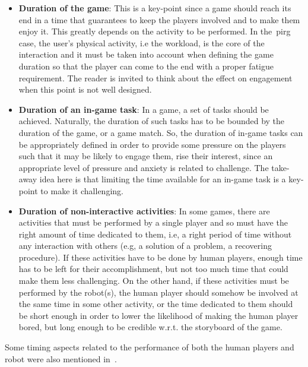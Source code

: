 \begin{itemize}
\item \textbf{Duration of the game}: This is a key-point since a game should reach its end in a time that guarantees to keep the players involved and to make them enjoy it. This greatly depends on the activity to be performed. In the~\gls{pirg} case, the user's physical activity, i.e the workload, is the core of the interaction and it must be taken into account when defining the game duration so that the player can come to the end with a proper fatigue requirement. The reader is invited to think about the effect on engagement when this point is not well designed.

\item \textbf{Duration of an in-game task}: In a game, a set of tasks should be achieved. Naturally, the duration of such tasks has to be bounded by the duration of the game, or a game match. So, the duration of in-game tasks can be appropriately defined in order to provide some pressure on the players such that it may be likely to engage them, rise their interest, since an appropriate level of pressure and anxiety is related to challenge. The take-away idea here is that limiting the time available for an in-game task is a key-point to make it challenging.

\item \textbf{Duration of non-interactive activities}: In some games, there are activities that must be performed by a single player and so must have the right amount of time dedicated to them, i.e, a right period of time without any interaction with others (e.g, a solution of a problem, a recovering procedure). If these activities have to be done by human players, enough time has to be left for their accomplishment, but not too much time that could make them less challenging. On the other hand, if these activities must be performed by the robot(s), the human player should somehow be involved at the same time in some other activity, or the time dedicated to them should be short enough in order to lower the likelihood of making the human player bored, but long enough to be credible w.r.t. the storyboard of the game.
\end{itemize}

Some timing aspects related to the performance of both the human players and robot were also mentioned in~\cite{bonarini_timing_2014}.

